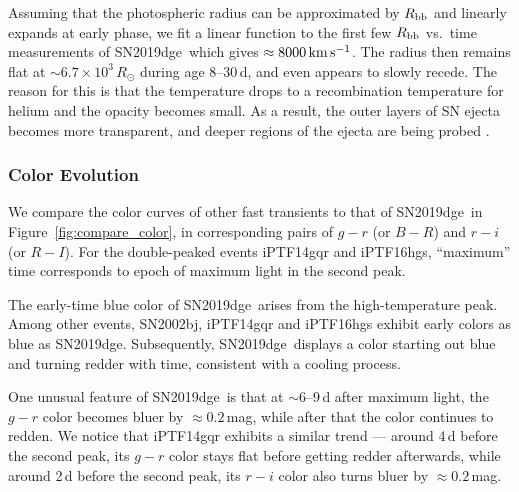 \documentclass[twocolumn]{aastex63}
\newcommand{\name}{SN2019dge}
\begin{document}
Assuming that the photospheric radius can be approximated by $R_{\rm bb}$ and linearly expands at 
early phase, we fit a linear function to the first few $R_{\rm bb}$ vs.~time measurements of \name\, 
which gives $\approx 8000\, {\rm km\,s^{-1}}$. The radius then remains flat at $\sim 6.7\times 
10^3\,R_\odot$ during age 8--30\,d, and even appears to slowly recede. The reason for this is that the 
temperature drops to a recombination temperature for helium and the opacity becomes small. As a 
result, the outer layers of SN ejecta becomes more transparent, and deeper regions of the ejecta are 
being probed \citep{Piro2014}.

\subsubsection{Color Evolution}
We compare the color curves of other fast transients to that of \name\ in 
Figure~\ref{fig:compare_color}, in corresponding pairs of {\color{red} $g-r$ (or $B-R$) and $r-i$ (or 
$R-I$)}. For 
the double-peaked events iPTF14gqr and iPTF16hgs, ``maximum'' time corresponds to epoch of 
maximum light in the second peak.

The early-time blue color of \name\ arises from the high-temperature peak. Among other events, 
SN2002bj, iPTF14gqr and iPTF16hgs exhibit early colors as blue as \name. Subsequently, 
\name\ displays a color starting out blue and turning redder with time, consistent with a cooling 
process. 

One unusual feature of \name\ is that at $\sim6$--9\,d after maximum light, the $g-r$ color becomes 
bluer by $\approx 0.2$\,mag, while after that the color continues to redden. We notice that iPTF14gqr
exhibits a similar trend --- around 4\,d before the second peak, its $g-r$ color stays flat before getting 
redder afterwards, while around 2\,d before the second peak, its $r-i$ color also turns bluer by 
$\approx 0.2$\,mag.
\end{document}
